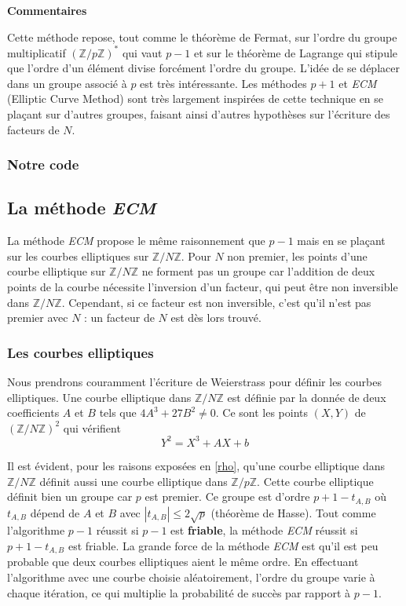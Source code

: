 \documentclass[11pt,a4paper]{article}
\begin{document}
\textbf{Commentaires}
	
	Cette méthode repose, tout comme le théorème de Fermat, sur l'ordre du groupe multiplicatif $(\mathbb{Z}/p\mathbb{Z})^*$ qui vaut $p-1$ et sur le théorème de Lagrange qui stipule que l'ordre d'un élément divise forcément l'ordre du groupe. L'idée de se déplacer dans un groupe associé à $p$ est très intéressante. Les méthodes $p+1$ et \textit{ECM} (Elliptic Curve Method) sont très largement inspirées de cette technique en se plaçant sur d'autres groupes, faisant ainsi d'autres hypothèses sur l'écriture des facteurs de $N$. 

\subsubsection{Notre code}



\subsection{La méthode \textit{ECM}}

	La méthode \textit{ECM} propose le même raisonnement que $p-1$ mais en se plaçant sur les courbes elliptiques sur $\mathbb{Z}/N\mathbb{Z}$. Pour $N$ non premier, les points d'une courbe elliptique sur $\mathbb{Z}/N\mathbb{Z}$ ne forment pas un groupe car l'addition de deux points de la courbe nécessite l'inversion d'un facteur, qui peut être non inversible dans $\mathbb{Z}/N\mathbb{Z}$. Cependant, si ce facteur est non inversible, c'est qu'il n'est pas premier avec $N$ : un facteur de $N$ est dès lors trouvé. 
	
\subsubsection{Les courbes elliptiques}
	
	Nous prendrons couramment l'écriture de Weierstrass pour définir les courbes elliptiques. Une courbe elliptique dans $\mathbb{Z}/N\mathbb{Z}$ est définie par la donnée de deux coefficients $A$ et $B$ tels que $4A^3+27B^2 \ne 0$. Ce sont les points $(X,Y)$ de $(\mathbb{Z}/N\mathbb{Z})^2$ qui vérifient
\begin{equation}
	Y^2 = X^3 + A X +b
\end{equation}

	Il est évident, pour les raisons exposées en \ref{rho}, qu'une courbe elliptique dans $\mathbb{Z}/N\mathbb{Z}$ définit aussi une courbe elliptique dans $\mathbb{Z}/p\mathbb{Z}$. Cette courbe elliptique définit bien un groupe car $p$ est premier. Ce groupe est d'ordre $p+1-t_{A,B}$ où $t_{A,B}$ dépend de $A$ et $B$ avec $|t_{A,B}| \leqslant 2 \sqrt{p}$ (théorème de Hasse). Tout comme l'algorithme $p-1$ réussit si $p-1$ est \textbf{friable}, la méthode \textit{ECM} réussit si $p+1-t_{A,B}$ est friable. La grande force de la méthode \textit{ECM} est qu'il est peu probable que deux courbes elliptiques aient le même ordre. En effectuant l'algorithme avec une courbe choisie aléatoirement, l'ordre du groupe varie à chaque itération, ce qui multiplie la probabilité de succès par rapport à $p-1$. 
\end{document}
